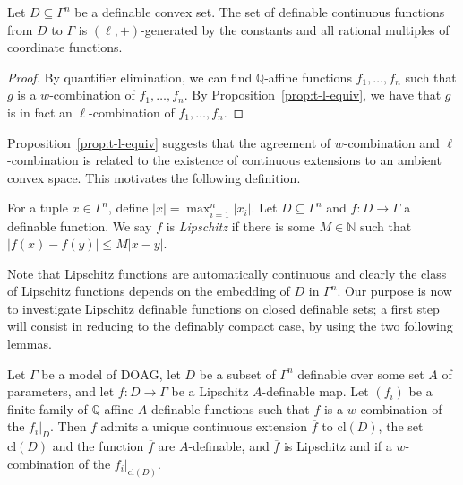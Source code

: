 \documentclass[JEP,XML,SOM,Unicode,ThmDefs,NoEqCountersInSection,published]{cedram}
\newcommand{\cl}{\mathrm{cl}}
\newcommand{\DOAG}{\mathrm{DOAG}}
\newcommand{\N}{\mathbb N}
\newcommand{\Q}{\mathbb Q}
\theoremstyle{plain}
\theoremstyle{definition}
\begin{document}
\begin{coro}\label{cor:cordinate}
Let $D\subseteq \Gamma^n$ be a definable convex set. The set of definable continuous functions from $D$
to $\Gamma$ is $(\ell,+)$-generated by the constants and all rational multiples of coordinate functions.
\end{coro}
\begin{proof}
By quantifier elimination, we can find $\Q$-affine functions $f_1,\ldots,f_n$ such that $g$ is a $w$-combination of
$f_1,\ldots,f_n$. By Proposition~\ref{prop:t-l-equiv}, we have that $g$ is in fact an $\ell$-combination of $f_1,\ldots,f_n$.
\end{proof}
Proposition~\ref{prop:t-l-equiv} suggests that the agreement of $w$-combination and $\ell$-combination is related to the existence of continuous extensions to an ambient convex space. This motivates the following definition.
\begin{defi}\label{def:Lipschitz}
For a tuple $x\in \Gamma^n$, define $|x|=\max^n_{i=1}|x_i|$. Let $D\subseteq\Gamma^n$ and $f:D\to \Gamma$ a definable function. We say $f$ is \emph{Lipschitz} if there is some $M\in \N$ such that $|f(x)-f(y)|\leq M|x-y|$. \end{defi}

Note that Lipschitz functions are automatically continuous and clearly the class of Lipschitz functions depends on the embedding of $D$ in $\Gamma^n$.
Our purpose is now to investigate
Lipschitz definable functions on closed definable sets; a first step
will consist in reducing to the definably compact case,
by using the two following lemmas.

\begin{lemm}\label{lem:lipschitz-closure}
Let $\Gamma$ be a model of $\DOAG$, let $D$
be a subset of $\Gamma^n$ definable over some set
$A$ of parameters, and let
$f\colon D\to \Gamma$ be a Lipschitz
$A$-definable map. Let $(f_i)$ be a finite family
of $\Q$-affine $A$-definable functions
such that $f$ is a $w$-combination
of the $f_i|_D$. Then $f$ admits a unique
continuous extension $\overline f$ to $\cl (D)$,
the set $\cl (D)$ and the function $\overline f$
are $A$-definable, and $\overline f$ is Lipschitz
and if a $w$-combination of
the $f_i|_{\cl (D)}$.
\end{lemm}
\end{document}
